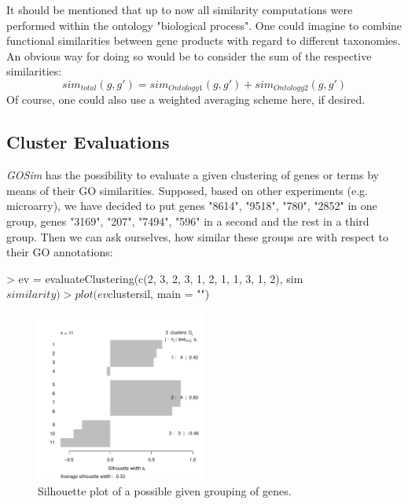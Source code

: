 \documentclass[12pt,a4paper]{article}
\begin{document}
It should be mentioned that up to now all similarity computations were performed within the ontology "biological process". One could imagine to combine functional similarities between gene products with regard to different taxonomies. An obvious way for doing so would be to consider the sum of the respective similarities:
\begin{equation}
sim_{total}(g,g') = sim_{Ontology1}(g,g') + sim_{Ontology2}(g,g')
\end{equation}
Of course, one could also use a weighted averaging scheme here, if desired.


\subsection{Cluster Evaluations}

\emph{GOSim} has the possibility to evaluate a given clustering of genes or terms by means of their GO similarities. Supposed, based on other experiments (e.g. microarry), we have decided to put genes "8614", "9518", "780", "2852" in one group, genes "3169", "207", "7494", "596" in a second and the rest in a third group. Then we can ask ourselves, how similar these groups are with respect to their GO annotations:
\begin{Schunk}
\begin{Sinput}
> ev = evaluateClustering(c(2, 3, 2, 3, 1, 2, 1, 1, 3, 1, 2), sim$similarity)
> plot(ev$clustersil, main = "")
\end{Sinput}
\end{Schunk}
\begin{figure}[t]
\begin{center}
\includegraphics[width=0.5\textwidth]{GOClustersil.pdf}
\caption{\label{Fig:GOClustersil}Silhouette plot of a possible given grouping of genes.}
\end{center}
\end{figure}
\end{document}
